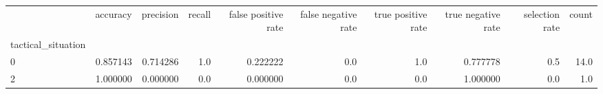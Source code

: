 \begin{tabular}{lrrrrrrrrr}
\toprule
{} &  accuracy &  precision &  recall &  false positive rate &  false negative rate &  true positive rate &  true negative rate &  selection rate &  count \\
tactical\_situation &           &            &         &                      &                      &                     &                     &                 &        \\
\midrule
0                  &  0.857143 &   0.714286 &     1.0 &             0.222222 &                  0.0 &                 1.0 &            0.777778 &             0.5 &   14.0 \\
2                  &  1.000000 &   0.000000 &     0.0 &             0.000000 &                  0.0 &                 0.0 &            1.000000 &             0.0 &    1.0 \\
\bottomrule
\end{tabular}
